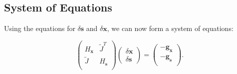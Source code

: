 \documentclass[letterpaper,12pt]{article}
\theoremstyle{remark}
\newcommand{\x}{\mathbf{x}}
\newcommand{\s}{\mathbf{s}}
\newcommand{\dx}{\delta \x}
\newcommand{\ds}{\delta \s}
\newcommand{\Hx}{ {H_\x} }
\newcommand{\Hs}{ {H_\s} }
\newcommand{\gx}{ {\mathbf{g}_\x} }
\newcommand{\gs}{ {\mathbf{g}_\s} }
\newcommand{\Jt}{ {\tilde{J}} }
\begin{document}
\subsection{System of Equations}
Using the equations for $\ds$ and $\dx$, we can now form a system of equations:

\begin{equation}
\begin{pmatrix}
\Hx & \Jt^T \\
\Jt & \Hs  \\
\end{pmatrix}
\begin{pmatrix}
\dx \\
\ds
\end{pmatrix} =
\begin{pmatrix}
-\gx \\
-\gs \\
\end{pmatrix}.
\end{equation}

%
\end{document}
